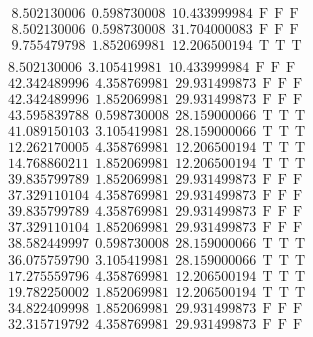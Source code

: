\documentclass[10pt,a4paper]{article}
\begin{document}
\begin{itemize}
\begin{displaymath}
{\begin{aligned}
& 8.502130006 ~~   0.598730008 ~~  10.433999984  ~~\mathrm{F  ~~ F  ~~  F} \\ 
& 8.502130006 ~~   0.598730008 ~~  31.704000083  ~~\mathrm{F  ~~ F  ~~  F} \\ 
& 9.755479798 ~~   1.852069981 ~~  12.206500194  ~~\mathrm{T  ~~ T  ~~ T } \\ 
				\end{aligned}
			}
		\end{displaymath}
		\begin{displaymath}
			\boxed{
				\begin{aligned}
& 8.502130006 ~~   3.105419981 ~~  10.433999984  ~~\mathrm{F  ~~ F  ~~  F} \\ 
&42.342489996 ~~   4.358769981 ~~  29.931499873  ~~\mathrm{F  ~~ F  ~~  F} \\ 
&42.342489996 ~~   1.852069981 ~~  29.931499873  ~~\mathrm{F  ~~ F  ~~  F} \\ 
&43.595839788 ~~   0.598730008 ~~  28.159000066  ~~\mathrm{T  ~~ T  ~~ T } \\ 
&41.089150103 ~~   3.105419981 ~~  28.159000066  ~~\mathrm{T  ~~ T  ~~ T } \\ 
&12.262170005 ~~   4.358769981 ~~  12.206500194  ~~\mathrm{T  ~~ T  ~~ T } \\ 
&14.768860211 ~~   1.852069981 ~~  12.206500194  ~~\mathrm{T  ~~ T  ~~ T } \\ 
&39.835799789 ~~   1.852069981 ~~  29.931499873  ~~\mathrm{F  ~~ F  ~~  F} \\ 
&37.329110104 ~~   4.358769981 ~~  29.931499873  ~~\mathrm{F  ~~ F  ~~  F} \\ 
&39.835799789 ~~   4.358769981 ~~  29.931499873  ~~\mathrm{F  ~~ F  ~~  F} \\ 
&37.329110104 ~~   1.852069981 ~~  29.931499873  ~~\mathrm{F  ~~ F  ~~  F} \\ 
&38.582449997 ~~   0.598730008 ~~  28.159000066  ~~\mathrm{T  ~~ T  ~~ T } \\ 
&36.075759790 ~~   3.105419981 ~~  28.159000066  ~~\mathrm{T  ~~ T  ~~ T } \\ 
&17.275559796 ~~   4.358769981 ~~  12.206500194  ~~\mathrm{T  ~~ T  ~~ T } \\ 
&19.782250002 ~~   1.852069981 ~~  12.206500194  ~~\mathrm{T  ~~ T  ~~ T } \\ 
&34.822409998 ~~   1.852069981 ~~  29.931499873  ~~\mathrm{F  ~~ F  ~~  F} \\ 
&32.315719792 ~~   4.358769981 ~~  29.931499873  ~~\mathrm{F  ~~ F  ~~  F} \\ 

\end{aligned}}
\end{displaymath}
\end{itemize}
\end{document}
